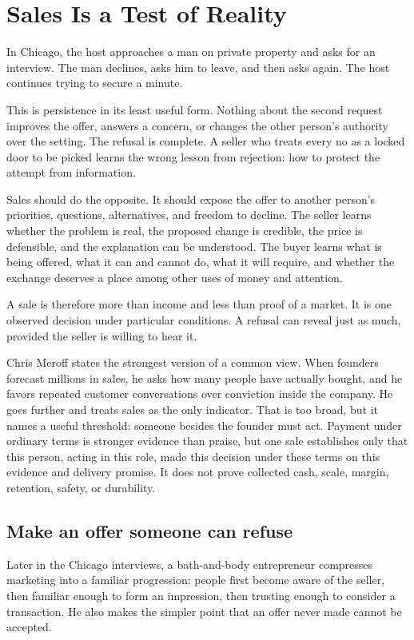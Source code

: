 \chapter{Sales Is a Test of Reality}

In Chicago, the host approaches a man on private property and asks for an
interview. The man declines, asks him to leave, and then asks again. The host
continues trying to secure a minute.

This is persistence in its least useful form. Nothing about the second request
improves the offer, answers a concern, or changes the other person's authority
over the setting. The refusal is complete. A seller who treats every no as a
locked door to be picked learns the wrong lesson from rejection: how to protect
the attempt from information.

Sales should do the opposite. It should expose the offer to another person's
priorities, questions, alternatives, and freedom to decline. The seller learns
whether the problem is real, the proposed change is credible, the price is
defensible, and the explanation can be understood. The buyer learns what is
being offered, what it can and cannot do, what it will require, and whether the
exchange deserves a place among other uses of money and attention.

A sale is therefore more than income and less than proof of a market. It is one
observed decision under particular conditions. A refusal can reveal just as
much, provided the seller is willing to hear it.

Chris Meroff states the strongest version of a common view. When founders
forecast millions in sales, he asks how many people have actually bought, and
he favors repeated customer conversations over conviction inside the company.
He goes further and treats sales as the only indicator. That is too broad, but
it names a useful threshold: someone besides the founder must act. Payment
under ordinary terms is stronger evidence than praise, but one sale establishes
only that this person, acting in this role, made this decision under these terms
on this evidence and delivery promise. It does not prove collected cash, scale,
margin, retention, safety, or durability.

\section{Make an offer someone can refuse}

Later in the Chicago interviews, a bath-and-body entrepreneur compresses
marketing into a familiar progression: people first become aware of the
seller, then familiar enough to form an impression, then trusting enough to
consider a transaction. He also makes the simpler point that an offer never
made cannot be accepted.

